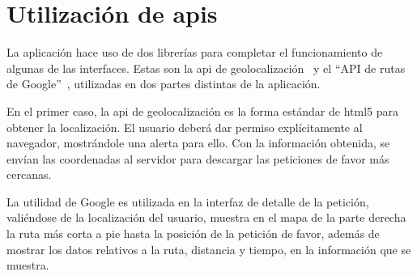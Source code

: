 \documentclass[main]{subfiles}
\begin{document}
\section[Utilización de APIs]{Utilización de \glspl{api}}

La aplicación hace uso de dos librerías para completar el funcionamiento de algunas de las interfaces. Estas son la \gls{api} de geolocalización~\autocite{geolocation-api} y el \enquote{API de rutas de Google}~\autocite{google-directions-api}, utilizadas en dos partes distintas de la aplicación.

En el primer caso, la \gls{api} de geolocalización es la forma estándar de \gls{html5} para obtener la localización. El usuario deberá dar permiso explícitamente al navegador, mostrándole una alerta para ello. Con la información obtenida, se envían las coordenadas al servidor para descargar las peticiones de favor más cercanas.

La utilidad de Google es utilizada en la interfaz de detalle de la petición, valiéndose de la localización del usuario, muestra en el mapa de la parte derecha la ruta más corta a pie hasta la posición de la petición de favor, además de mostrar los datos relativos a la ruta, distancia y tiempo, en la información que se muestra.
\end{document}
